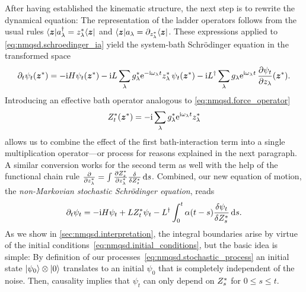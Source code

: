 After having established the kinematic structure, the next step is to rewrite the dynamical equation:
The representation of the ladder operators follows from the usual rules $\langle \boldsymbol{z} | a^\dagger_\lambda = {z}^*_\lambda \langle \boldsymbol{z} |$ and $\langle \boldsymbol{z} | a_\lambda = \partial_{{z}^*_\lambda} \langle \boldsymbol{z} |$.
These expressions applied to \autoref{eq:nmqsd.schroedinger_ia} yield the system-bath Schrödinger equation in the transformed space
\begin{equation}
  \partial_t \psi_t(\cc\zz) = -\ii\Hsys\psi_t(\cc\zz)  -  \ii L \sum_\lambda \cc g_\lambda \exp[-\ii\omega_\lambda t] \cc z_\lambda \, \psi_t(\cc\zz)  -  \ii \adj{L} \sum_\lambda g_\lambda \exp[\ii\omega_\lambda t] \, \frac{\partial \psi_t}{\partial z_\lambda}(\cc\zz).
  \label{eq:nmqsd.hamiltonian_microsopic}
\end{equation}
Introducing an effective bath operator analogous to \autoref{eq:nmqsd.force_operator}
\begin{equation}
  \ZZ_t(\cc\zz) = - \ii \sum_\lambda \cc g_\lambda \exp[\ii \omega_\lambda t] \cc z_\lambda
  \label{eq:nmqsd.stochastic_process}
\end{equation}
allows us to combine the effect of the first bath-interaction term into a single multiplication operator---or process for reasons explained in the next paragraph.
A similar conversion works for the second term as well with the help of the functional chain rule $\frac{\partial}{\partial {z}^*_\lambda} = \int \frac{\partial {Z}^*_s}{\partial{z}^*_\lambda} \frac{\delta}{\delta {Z}^*_s} \, \mathrm{d} s$.
Combined, our new equation of motion, the \emph{non-Markovian stochastic Schrödinger equation}, reads \cite{DiGiSt98_nmqsd}
\begin{equation}
  \partial_t \psi_t = -\mathrm{i}H\psi_t  +  L{Z}^*_t\psi_t  -  L^\dagger \int_0^t \alpha(t-s) \frac{\delta \psi_t}{\delta {Z}^*_s} \, \mathrm{d} s.
  \label{eq:nmqsd.nmsse}
\end{equation}
As we show in \autoref{sec:nmqsd.interpretation}, the integral boundaries arise by virtue of the initial conditions~\ref{eq:nmqsd.initial_conditions}, but the basic idea is simple:
By definition of our processes~\ref{eq:nmqsd.stochastic_process} an initial state $| \psi_0 \rangle\otimes| 0 \rangle$ translates to an initial $\psi_0$ that is completely independent of the noise.
Then, causality implies that $\psi_t$ can only depend on ${Z}^*_s$ for $0 \le s \le t$.\\



